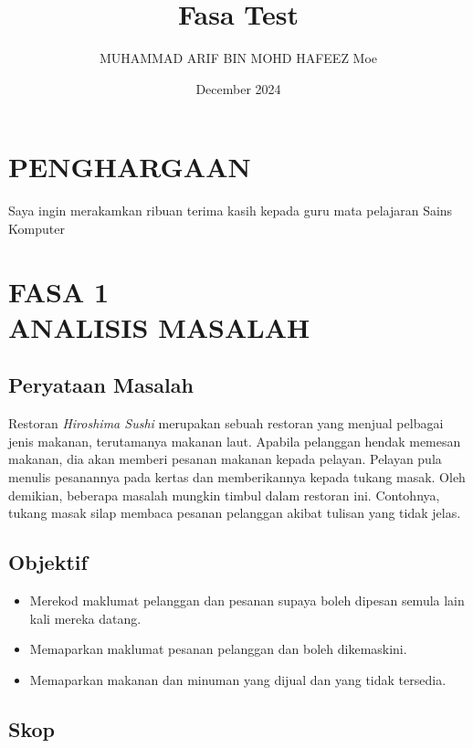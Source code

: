 \documentclass[a4paper, 12pt]{article}
\title{Fasa Test}
\author{MUHAMMAD ARIF BIN MOHD HAFEEZ Moe}
\date{December 2024}
\begin{document}
\section*{PENGHARGAAN}

\begin{center}
    Saya ingin merakamkan ribuan terima kasih kepada guru mata pelajaran Sains Komputer 
\end{center}

\newpage
\tableofcontents

\newpage
\section{FASA 1 \\[1em] ANALISIS MASALAH}

\subsection{Peryataan Masalah}

Restoran \textit{Hiroshima Sushi} merupakan sebuah restoran yang menjual pelbagai jenis makanan, terutamanya makanan laut. Apabila pelanggan hendak memesan makanan, dia akan memberi pesanan makanan kepada pelayan. Pelayan pula menulis pesanannya pada kertas dan memberikannya kepada tukang masak. Oleh demikian, beberapa masalah mungkin timbul dalam restoran ini. Contohnya, tukang masak silap membaca pesanan pelanggan akibat tulisan yang tidak jelas.

\subsection{Objektif}

\begin{itemize}
    \item Merekod maklumat pelanggan dan pesanan supaya boleh dipesan semula lain kali mereka datang.
    \item Memaparkan maklumat pesanan pelanggan dan boleh dikemaskini.
    \item Memaparkan makanan dan minuman yang dijual dan yang tidak tersedia.
\end{itemize}

\subsection{Skop}
\end{document}
